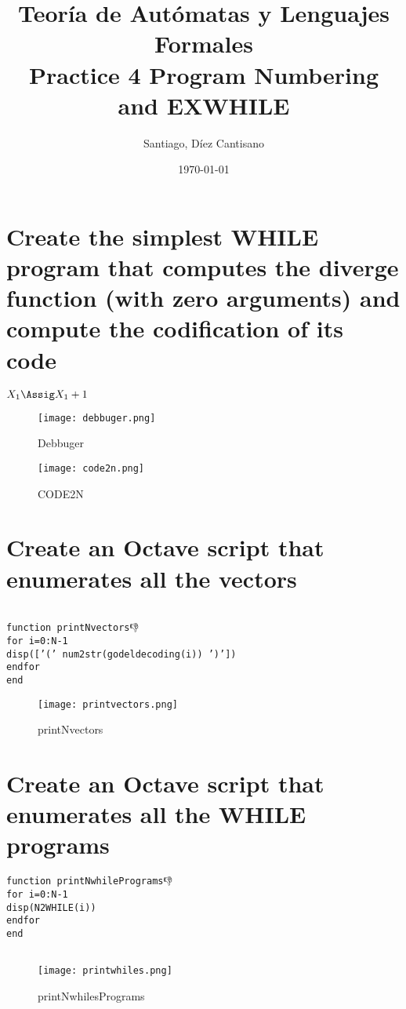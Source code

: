 \documentclass{article}
\title{Teoría de Autómatas y Lenguajes Formales\\[.4\baselineskip]Practice 4
Program Numbering and EXWHILE}
\author{Santiago, Díez Cantisano}
\date{\today}
\theoremstyle{plain}
\theoremstyle{definition}
\begin{document}
\maketitle

\section{Create the simplest WHILE program that computes the diverge function (with zero arguments) and compute the codification of its code}

\begin{whilecode}[H]
$X_1\Assig X_1 + 1$\;
 \end{whilecode}
 
 \begin{figure}
    \centering
    \texttt{[image: debbuger.png]}
    \caption{Debbuger}
    \label{fig:my_label}
\end{figure}
 
  \begin{figure}
    \centering
    \texttt{[image: code2n.png]}
    \caption{CODE2N}
    \label{fig:my_label}
\end{figure}



\newpage
\section{Create an Octave script that enumerates all the vectors}



\begin{center}
\begin{verbatim}

function printNvectors👎
for i=0:N-1
disp([’(’ num2str(godeldecoding(i)) ’)’])
endfor
end
\end{verbatim}
\end{center}
\begin{figure}
    \centering
    \texttt{[image: printvectors.png]}
    \caption{printNvectors}
    \label{fig:my_label}
\end{figure}


\newpage
\section{Create an Octave script that enumerates all the WHILE programs}

\begin{center}
\begin{verbatim}
function printNwhilePrograms👎
for i=0:N-1
disp(N2WHILE(i))
endfor
end


\end{verbatim}
\end{center}

\begin{figure}
    \centering
    \texttt{[image: printwhiles.png]}
    \caption{printNwhilesPrograms}
    \label{fig:my_label}
\end{figure}
\end{document}
